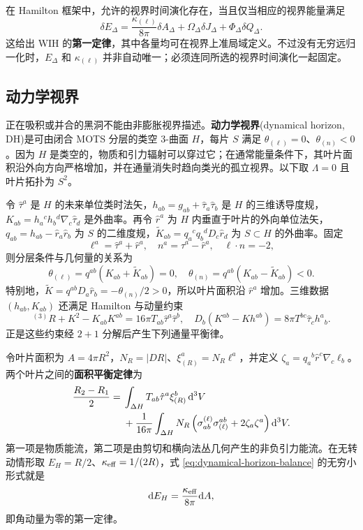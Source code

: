 在 Hamilton 框架中，允许的视界时间演化存在，当且仅当相应的视界能量满足
\begin{equation}
    \delta E_\Delta=\frac{\kappa_{(\ell)}}{8\pi}\delta A_\Delta
      +\Omega_\Delta\delta J_\Delta+\Phi_\Delta\delta Q_\Delta .
\end{equation}
这给出 WIH 的\textbf{第一定律}，其中各量均可在视界上准局域定义。不过没有无穷远归一化时，$E_\Delta$ 和 $\kappa_{(\ell)}$ 并非自动唯一；必须连同所选的视界时间演化一起固定。

\subsection{动力学视界}

正在吸积或并合的黑洞不能由非膨胀视界描述。\textbf{动力学视界}(dynamical horizon, DH)是可由闭合 MOTS 分层的类空 3-曲面 $H$，每片 $S$ 满足 $\theta_{(\ell)}=0$、$\theta_{(n)}<0$。因为 $H$ 是类空的，物质和引力辐射可以穿过它；在通常能量条件下，其叶片面积沿外向方向严格增加，并在通量消失时趋向类光的孤立视界。以下取 $\Lambda=0$ 且叶片拓扑为 $S^2$。

令 $\hat\tau^a$ 是 $H$ 的未来单位类时法矢，$h_{ab}=g_{ab}+\hat\tau_a\hat\tau_b$ 是 $H$ 的三维诱导度规，$K_{ab}=h_a{}^ch_b{}^d\nabla_c\hat\tau_d$ 是外曲率。再令 $\hat r^a$ 为 $H$ 内垂直于叶片的外向单位法矢，$q_{ab}=h_{ab}-\hat r_a\hat r_b$ 为 $S$ 的二维度规，$\widetilde K_{ab}=q_a{}^cq_b{}^dD_c\hat r_d$ 为 $S\subset H$ 的外曲率。固定
\[
    \ell^a=\hat\tau^a+\hat r^a,\quad
    n^a=\hat\tau^a-\hat r^a,\quad
    \ell\cdot n=-2,
\]
则分层条件与几何量的关系为
\begin{equation}
    \theta_{(\ell)}=q^{ab}(K_{ab}+\widetilde K_{ab})=0,
    \quad
    \theta_{(n)}=q^{ab}(K_{ab}-\widetilde K_{ab})<0.
\end{equation}
特别地，$\widetilde K=q^{ab}D_a\hat r_b=-\theta_{(n)}/2>0$，所以叶片面积沿 $\hat r^a$ 增加。三维数据 $(h_{ab},K_{ab})$ 还满足 Hamilton 与动量约束
\begin{equation}
    {}^{(3)}R+K^2-K_{ab}K^{ab}
       =16\pi T_{ab}\hat\tau^a\hat\tau^b,
    \quad
    D_b(K^{ab}-Kh^{ab})
       =8\pi T^{bc}\hat\tau_c h^a{}_b .
\end{equation}
正是这些约束经 $2+1$ 分解后产生下列通量平衡律。

令叶片面积为 $A=4\pi R^2$，$N_R=|D R|$、$\xi^a_{(R)}=N_R\ell^a$，并定义 $\zeta_a=q_a{}^b\hat r^c\nabla_c\ell_b$。两个叶片之间的\textbf{面积平衡定律}为
\begin{equation}\label{eq:dynamical-horizon-balance}
\begin{split}
    \frac{R_2-R_1}{2}={}&
    \int_{\Delta H}T_{ab}\hat\tau^a\xi^b_{(R)}\,\dd^3V\\
    &+\frac{1}{16\pi}\int_{\Delta H}N_R
      \left(\sigma^{(\ell)}_{ab}\sigma_{(\ell)}^{ab}
      +2\zeta_a\zeta^a\right)\dd^3V .
\end{split}
\end{equation}
第一项是物质能流，第二项是由剪切和横向法丛几何产生的非负引力能流。在无转动情形取 $E_H=R/2$、$\kappa_{\rm eff}=1/(2R)$，式 \eqref{eq:dynamical-horizon-balance} 的无穷小形式就是
\begin{equation}
    \dd E_H=\frac{\kappa_{\rm eff}}{8\pi}\dd A ,
\end{equation}
即角动量为零的第一定律。

